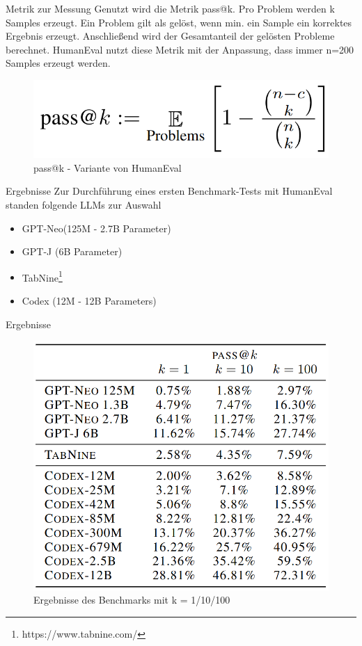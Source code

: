 \documentclass{beamer}              %
\begin{document}
\begin{frame}{Metrik zur Messung}
Genutzt wird die Metrik pass@k. Pro Problem werden k Samples erzeugt. Ein Problem gilt als gelöst, wenn min. ein Sample ein korrektes Ergebnis erzeugt. Anschließend wird der Gesamtanteil der gelösten Probleme berechnet. HumanEval nutzt diese Metrik mit der Anpassung, dass immer n=200 Samples erzeugt werden.
    \begin{figure}
        \centering
        \includegraphics[width=0.6\paperwidth]{images/passk.png}
        \caption{pass@k - Variante von HumanEval\cite{chen2021evaluating}}
    \end{figure}
\end{frame}

\begin{frame}{Ergebnisse}
Zur Durchführung eines ersten Benchmark-Tests mit HumanEval standen folgende LLMs zur Auswahl
\begin{itemize}
    \item GPT-Neo(125M - 2.7B Parameter)\cite{black2021gptneo}
    \item GPT-J (6B Parameter)\cite{wang2021gptj}
    \item TabNine\footnote{https://www.tabnine.com/}
    \item Codex (12M - 12B Parameters)
\end{itemize}
\end{frame}

\begin{frame}{Ergebnisse}
    \begin{figure}
        \centering
        \includegraphics[width=0.55\paperwidth]{images/humanevaleval.png}
        \caption{Ergebnisse des Benchmarks mit k = 1/10/100\cite{chen2021evaluating}}
    \end{figure}
\end{frame}
\end{document}
